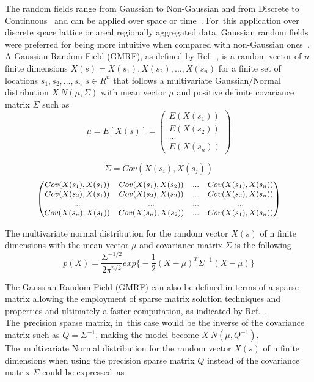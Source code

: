 \documentclass[energies,article,accept,pdftex,moreauthors]{Definitions/mdpi}
\begin{document}
     The random fields range from Gaussian to Non-Gaussian and from Discrete to Continuous~\citep{Christakos2005RandomSciences}  and can be applied over space or time~\citep{Ibe2013MarkovEdition}. For~this application over discrete space lattice or areal regionally aggregated data, Gaussian random fields were preferred for being more intuitive when compared with non-Gaussian ones~\citep{Haran2011GaussianData}. 
     A Gaussian Random Field (GMRF), as defined by Ref.~\citep{Rue2005GaussianApplications}, is a random vector of $n$ finite dimensions \(X(s)={X(s_1),X(s_2),…,X(s_n)}\) for a finite set of locations \(s_1,s_2,…,s_n\) \(s \in R^{n}\)  that follows a multivariate Gaussian/Normal distribution \(X~N(\mu,\Sigma)\) with mean vector $\mu$ and positive definite covariance matrix $\Sigma$ such as
\begin{equation}
	\mu=E[X(s)]=
	\begin{pmatrix}
    E(X(s_1))\\
    E(X(s_2))\\
    ...\\
    E(X(s_n))
    \end{pmatrix}
	\end{equation}
	
	\begin{equation*}
	   \Sigma=Cov(X(s_i),X(s_j))
	\end{equation*}
\begin{equation}
	\begin{small}
	\begin{pmatrix}
	Cov(X(s_1),X(s_1)) & Cov(X(s_1),X(s_2)) &  ... & Cov(X(s_1),X(s_n))\\
	Cov(X(s_2),X(s_1)) & Cov(X(s_2),X(s_2)) &  ... & Cov(X(s_2),X(s_n))\\
	... & ... & ... & ... \\
	Cov(X(s_n),X(s_1)) & Cov(X(s_n),X(s_2)) &  ... & Cov(X(s_1),X(s_n))
	\end{pmatrix}
	\end{small}
	\end{equation}
	
	The multivariate normal distribution for the random vector $X(s)$ of n finite dimensions with the mean vector $\mu$ and covariance matrix $\Sigma$ is the following
\begin{equation}
    p(X)=\frac{\Sigma^{-1/2}}{2\pi^{n/2}}exp\Big\{-\frac{1}{2}(X-\mu)^{T} \Sigma^{-1} (X-\mu)\Big\}
    \end{equation}
    
    The Gaussian Random Field (GMRF) can also be defined in terms of a sparse matrix allowing the employment of sparse matrix solution techniques and properties and ultimately a faster computation, as indicated by Ref.~\citep{Rue2005GaussianApplications}. The~precision sparse matrix, in~this case would be the inverse of the covariance matrix such as $Q=\Sigma^{-1}$, making the model become $X~N(\mu,Q^{-1})$. The~multivariate Normal distribution for the random vector $X(s)$ of n finite dimensions when using the precision sparse matrix $Q$ instead of the covariance matrix $\Sigma$  could be expressed~as
    
\end{document}
